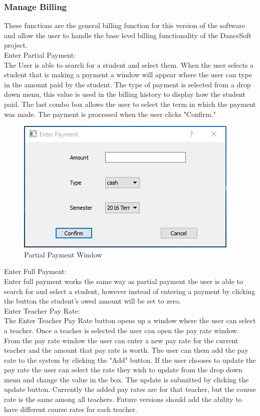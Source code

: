 \subsubsection{Manage Billing}
These functions are the general billing function for this version of the software and allow the user to handle the base level billing functionality of the DanceSoft project.\\

Enter Partial Payment:\\
The User is able to search for a student and select them. When the user selects a student that is making a payment a window will appear where the user can type in the amount paid by the student. The type of payment is selected from a drop down menu, this value is used in the billing history to display how the student paid. The last combo box allows the user to select the term in which the payment was made. The payment is processed when the user clicks "Confirm."\\

\begin{figure}
  \includegraphics[width=\linewidth]{pics/userGuide/partPay.png}
  \caption{Partial Payment Window} 
  \label{fig:User doc: Partial Payment}
\end{figure}
  
Enter Full Payment:\\
Enter full payment works the same way as partial payment the user is able to search for and select a student, however instead of entering a payment by clicking the button the student's owed amount will be set to zero.\\

Enter Teacher Pay Rate:\\
The Enter Teacher Pay Rate button opens up a window where the user can select a teacher. Once a teacher is selected the user can open the pay rate window. From the pay rate window the user can enter a new pay rate for the current teacher and the amount that pay rate is worth. The user can them add the pay rate to the system by clicking the "Add" button. If the user chooses to update the pay rate the user can select the rate they wish to update from the drop down menu and change the value in the box. The update is submitted by clicking the update button. Currently the added pay rates are for that teacher, but the course rate is the same among all teachers. Future versions should add the ability to have different course rates for each teacher.\\\

